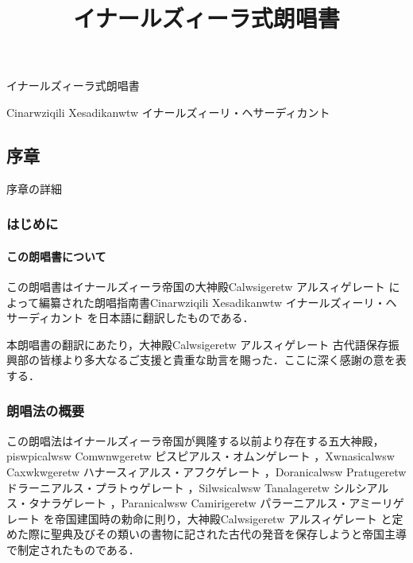 \documentclass[
  japanese,
]{article}
\title{イナールズィーラ式朗唱書}
\author{}
\date{}
\begin{document}
\maketitle

{
\setcounter{tocdepth}{3}
\tableofcontents
}
\section{}\label{section}

イナールズィーラ式朗唱書

{Cinarwziqili Xesadikanwtw} イナールズィーリ・ヘサーディカント

\subsection{序章}\label{chapter1}

序章の詳細

\subsubsection{はじめに}\label{section1.1}

\paragraph{この朗唱書について}\label{subsection1.1.1}

この朗唱書はイナールズィーラ帝国の大神殿{Calwsigeretw} アルスィゲレート
によって編纂された朗唱指南書{Cinarwziqili Xesadikanwtw}
イナールズィーリ・ヘサーディカント を日本語に翻訳したものである．

本朗唱書の翻訳にあたり，大神殿{Calwsigeretw} アルスィゲレート
古代語保存振興部の皆様より多大なるご支援と貴重な助言を賜った．ここに深く感謝の意を表する．

\subsubsection{朗唱法の概要}\label{section1.2}

この朗唱法はイナールズィーラ帝国が興隆する以前より存在する五大神殿，{piswpicalwsw
Comwnwgeretw} ピスピアルス・オムンゲレート ，{Xwnasicalwsw Caxwkwgeretw}
ハナースィアルス・アフクゲレート ，{Doranicalwsw Pratugeretw}
ドラーニアルス・プラトゥゲレート ，{Silwsicalwsw Tanalageretw}
シルシアルス・タナラゲレート ，{Paranicalwsw Camirigeretw}
パラーニアルス・アミーリゲレート
を帝国建国時の勅命に則り，大神殿{Calwsigeretw} アルスィゲレート
と定めた際に聖典及びその類いの書物に記された古代の発音を保存しようと帝国主導で制定されたものである．
\end{document}
